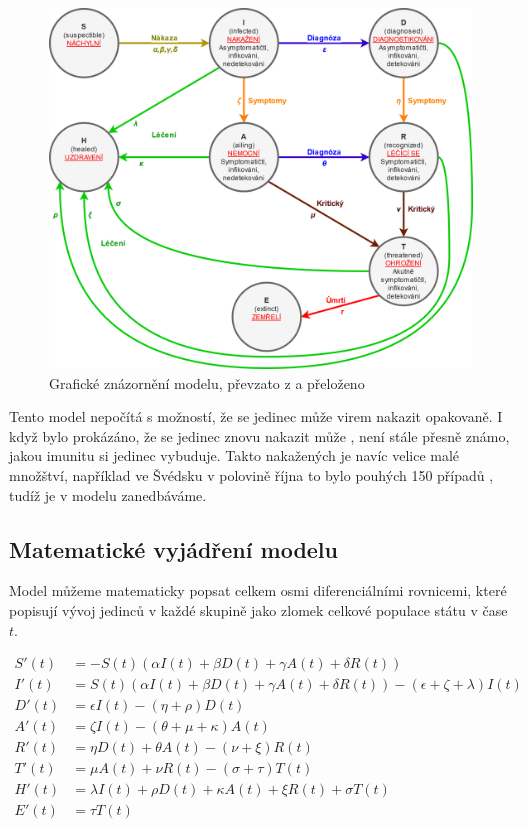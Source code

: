\documentclass[a4paper,11pt]{article}
\begin{document}
		\begin{figure}[H]
			\caption{Grafické znázornění modelu, převzato z \cite{source} a přeloženo}
			\label{fig1}
			\centering
			\includegraphics[scale=0.25]{model.png}
		\end{figure}
	
		Tento model nepočítá s možností, že se jedinec může virem nakazit opakovaně. I když bylo prokázáno, že se jedinec znovu nakazit může \cite{reinfection}, není stále přesně známo, jakou imunitu si jedinec vybuduje. Takto nakažených je navíc velice malé množštví, například ve Švédsku v polovině října to bylo pouhých 150 případů \cite{reincases}, tudíž je v modelu zanedbáváme.
		
		\subsection{Matematické vyjádření modelu}
		\label{mathmodel}
		Model můžeme matematicky popsat celkem osmi diferenciálními rovnicemi, které popisují vývoj jedinců v každé skupině jako zlomek celkové populace státu v čase $t$.
		
		\begin{align}
			S'(t) &= - S(t) (\alpha I(t) + \beta D(t) + \gamma A(t) + \delta R(t))\\
			I'(t) &= S(t) (\alpha I(t) + \beta D(t) + \gamma A(t) + \delta R(t)) - (\epsilon + \zeta + \lambda)I(t)\\
			D'(t) &= \epsilon I(t) - (\eta + \rho) D(t)\\
			A'(t) &= \zeta I(t) - (\theta + \mu + \kappa) A(t)\\
			R'(t) &= \eta D(t) + \theta A(t) - (\nu + \xi) R(t)\\
			T'(t) &= \mu A(t) + \nu R(t) - (\sigma + \tau) T(t)\\
			H'(t) &= \lambda I(t) + \rho D(t) + \kappa A(t) + \xi R(t) + \sigma T(t)\\
			E'(t) &= \tau T(t)
		\end{align}
	
\end{document}
